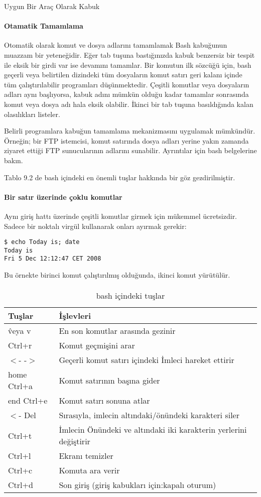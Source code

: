 \begin{section}{Uygun Bir Araç Olarak Kabuk}
\paragraph{Otamatik Tamamlama}{Otomatik olarak komut ve dosya adlarını tamamlamak Bash kabuğunun muazzam bir yeteneğidir. Eğer tab tuşuna bastığınızda kabuk benzersiz bir tespit ile eksik bir girdi var ise devamını tamamlar. Bir komutun ilk sözcüğü için, bash geçerli veya belirtilen dizindeki tüm dosyaların komut satırı geri kalanı içinde tüm çalıştırılabilir programları düşünmektedir. Çeşitli komutlar veya dosyaların adları aynı başlıyorsa, kabuk adını mümkün olduğu kadar tamamlar sonrasında komut veya dosya adı hala eksik olabilir. İkinci bir tab tuşuna basıldığında kalan olasılıkları listeler.}

Belirli programlara kabuğun tamamlama mekanizmasını uygulamak mümkündür. Örneğin; bir FTP istemcisi, komut satırında dosya adları yerine yakın zamanda ziyaret ettiği FTP sunucularının adlarını sunabilir. Ayrıntılar için bash belgelerine bakın.

Tablo 9.2 de bash içindeki en önemli tuşlar hakkında bir göz gezdirilmiştir.
\paragraph{Bir satır üzerinde çoklu komutlar}{Aynı giriş hattı üzerinde çeşitli komutlar girmek için mükemmel ücretsizdir. Sadece bir noktalı virgül kullanarak onları ayırmak gerekir:
\begin{verbatim}
$ echo Today is; date
Today is
Fri 5 Dec 12:12:47 CET 2008
\end{verbatim}}

Bu örnekte birinci komut çalıştırılmış olduğunda, ikinci komut yürütülür.
\paragraph{}{
\begin {table}[H]
\caption {bash içindeki tuşlar} \label{tab:title} 
\begin{tabular}{l l}
\hline
Tuşlar & İşlevleri\\
\hline
\^ veya v	&	En son komutlar arasında gezinir\\
Ctrl+r		&	Komut geçmişini arar\\
$<$- -$>$		&	Geçerli komut satırı içindeki İmleci hareket ettirir\\
home Ctrl+a	&	Komut satırının başına gider\\
end Ctrl+e	&	Komut satırı sonuna atlar\\
$<$- Del		&	Sırasıyla, imlecin altındaki/önündeki karakteri siler\\
Ctrl+t		&	İmlecin Önündeki ve altındaki iki karakterin yerlerini değiştirir\\
Ctrl+l		&	Ekranı temizler\\
Ctrl+c		&	Komuta ara verir\\
Ctrl+d		&	Son giriş (giriş kabukları için:kapalı oturum)\\
\hline
\end{tabular}
\end {table}}

\end{section}
